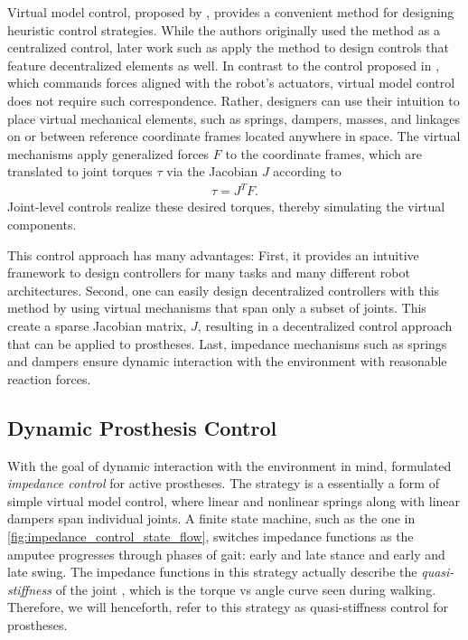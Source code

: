 Virtual model control, proposed by \citet{pratt2001virtual}, provides a
convenient method for designing heuristic control strategies. While the authors
originally used the method as a centralized control, later work such as
\citet{ajallooeian2013central} apply the method to design controls that feature
decentralized elements as well. In contrast to the control proposed in
\citet{raibert1983dynamically}, which commands forces aligned with the robot's
actuators, virtual model control does not require such correspondence. Rather,
designers can use their intuition to place virtual mechanical elements, such as
springs, dampers, masses, and linkages on or between reference coordinate frames
located anywhere in space.  The virtual mechanisms apply generalized forces $F$
to the coordinate frames, which are translated to joint torques $\tau$ via the
Jacobian $J$ according to
\begin{align}
    \tau = J^T F.
\end{align}
Joint-level controls realize these desired torques, thereby simulating the
virtual components. 

This control approach has many advantages: First, it provides an intuitive
framework to design controllers for many tasks and many different robot
architectures. Second, one can easily design decentralized controllers with this
method by using virtual mechanisms that span only a subset of joints. This
create a sparse Jacobian matrix, $J$, resulting in a decentralized control
approach that can be applied to prostheses. Last, impedance mechanisms such as
springs and dampers ensure dynamic interaction with the environment with
reasonable reaction forces.

\subsection{Dynamic Prosthesis Control}
With the goal of dynamic interaction with the environment in mind,
\citet{sup2007design} formulated \emph{impedance control} for active prostheses.
The strategy is a essentially a form of simple virtual model control, where
linear and nonlinear springs along with linear dampers span individual joints.
A finite state machine, such as the one in
\cref{fig:impedance_control_state_flow}, switches impedance functions as the
amputee progresses through phases of gait: early and late stance and early and
late swing. The impedance functions in this strategy actually describe the
\emph{quasi-stiffness} of the joint \citep{rouse2013difference}, which is the
torque vs angle curve seen during walking. Therefore, we will henceforth, refer
to this strategy as quasi-stiffness control for prostheses.

